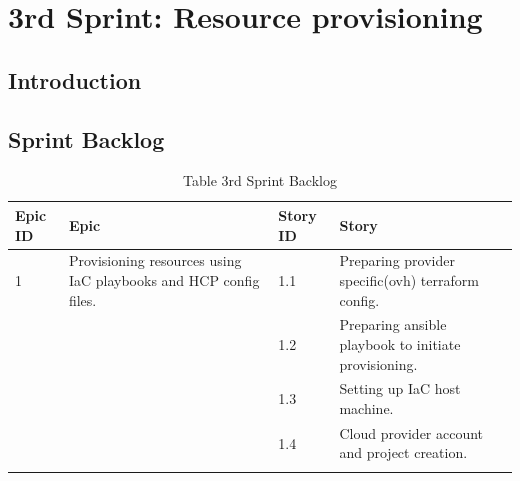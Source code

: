 \graphicspath{{./assets/}}
\setcounter{mtc}{5}
\chapter{3rd Sprint: Resource provisioning  }

\minitoc
\newpage
\section*{Introduction}

\section{Sprint Backlog}

\begin{longtable}[H]{|m{1.5cm}|m{3cm}|m{1.5cm}|m{8cm}|}
\hline
{\textbf{Epic ID}} & {\textbf{Epic}} & {\textbf{Story ID}} & {\textbf{Story}}\\
\hline
1  & \raggedright Provisioning resources using IaC playbooks and HCP config files.  &  1.1	 & Preparing provider specific(ovh) terraform config. \\
\cline{3-4}
& & 1.2 & Preparing ansible playbook to initiate provisioning. \\
\cline{3-4}
& & 1.3	& Setting up IaC host machine.  \\
\cline{3-4}
& & 1.4	& Cloud provider account and project creation.  \\
\hline
\caption{Table 3rd Sprint Backlog}
\end{longtable}

